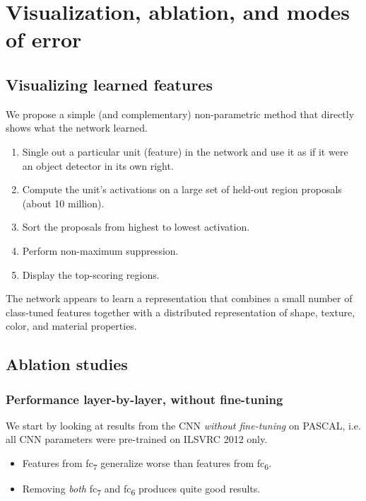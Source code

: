 \documentclass[a4paper,12pt]{article}
\begin{document}
\section{Visualization, ablation, and modes of error}

\subsection{Visualizing learned features}

We propose a simple (and complementary) non-parametric method that directly shows what the network learned.

\begin{enumerate}
  \item Single out a particular unit (feature) in the network and use it as if it were an object detector in its own right.
  \item Compute the unit’s activations on a large set of held-out region proposals (about 10 million).
  \item Sort the proposals from highest to lowest activation.
  \item Perform non-maximum suppression.
  \item Display the top-scoring regions.
\end{enumerate}

The network appears to learn a representation that combines a small number of class-tuned features together with a distributed representation of shape, texture, color, and material properties.

\subsection{Ablation studies}

\subsubsection{Performance layer-by-layer, without fine-tuning}

We start by looking at results from the CNN \emph{without fine-tuning} on PASCAL, i.e. all CNN parameters were pre-trained on ILSVRC 2012 only.

\begin{itemize}
  \item Features from fc\textsubscript{7} generalize worse than features from fc\textsubscript{6}.
  \item Removing \emph{both} fc\textsubscript{7} and fc\textsubscript{6} produces quite good results.
\end{itemize}
\end{document}
